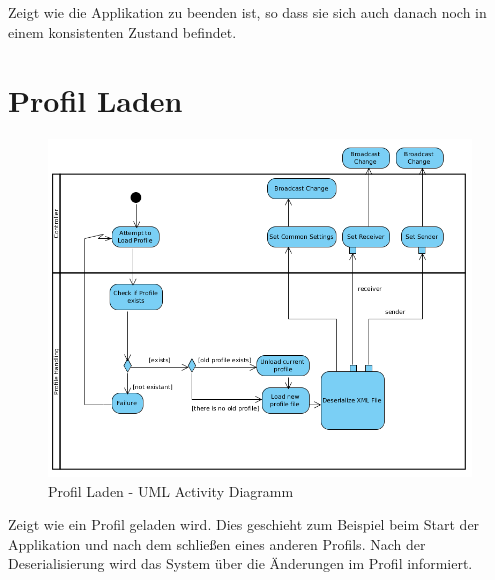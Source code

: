 Zeigt wie die Applikation zu beenden ist, so dass sie sich auch danach
noch in einem konsistenten Zustand befindet.

\section{Profil Laden}
\label{sec:5:loadprofile}
\begin{figure}[H]
\includegraphics[width=15cm]{images/LoadProfile.png}
\centering
\caption{Profil Laden - UML Activity Diagramm}
\label{fig_loadprofile}
\end{figure}

Zeigt wie ein Profil geladen wird. Dies geschieht zum Beispiel beim
Start der Applikation und nach dem schließen eines anderen Profils.
Nach der Deserialisierung wird das System über die Änderungen im Profil
informiert.

